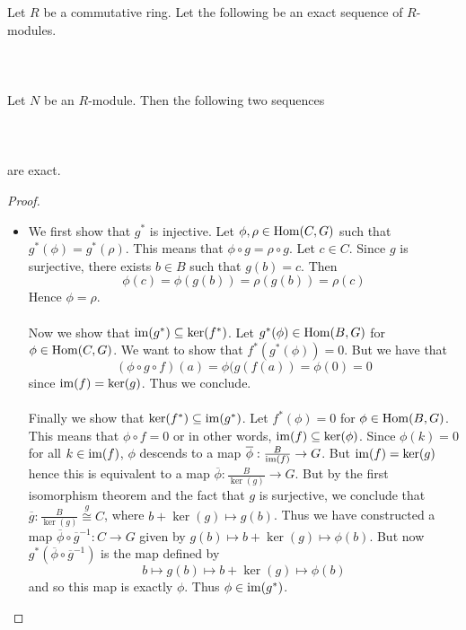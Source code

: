 \documentclass[a4paper]{article}
\begin{document}
\begin{prp}{}{} Let $R$ be a commutative ring. Let the following be an exact sequence of $R$-modules. \\~\\
\\~\\ Let $N$ be an $R$-module. Then the following two sequences \\~\\
 \\~\\ 
are exact. \tcbline
\begin{proof}~\\
\begin{itemize}
\item We first show that $g^\ast$ is injective. Let $\phi,\rho\in\operatorname{Hom}(C,G)$ such that $g^\ast(\phi)=g^\ast(\rho)$. This means that $\phi\circ g=\rho\circ g$. Let $c\in C$. Since $g$ is surjective, there exists $b\in B$ such that $g(b)=c$. Then $$\phi(c)=\phi(g(b))=\rho(g(b))=\rho(c)$$ Hence $\phi=\rho$. \\~\\

Now we show that $\operatorname{im}(g^\ast)\subseteq\ker(f^\ast)$. Let $g^\ast(\phi)\in\operatorname{Hom}(B,G)$ for $\phi\in\operatorname{Hom}(C,G)$. We want to show that $f^\ast(g^\ast(\phi))=0$. But we have that $$(\phi\circ g\circ f)(a)=\phi(g(f(a))=\phi(0)=0$$ since $\operatorname{im}(f)=\ker(g)$. Thus we conclude. \\~\\

Finally we show that $\ker(f^\ast)\subseteq\operatorname{im}(g^\ast)$. Let $f^\ast(\phi)=0$ for $\phi\in\operatorname{Hom}(B,G)$. This means that $\phi\circ f=0$ or in other words, $\operatorname{im}(f)\subseteq\ker(\phi)$.
Since $\phi(k)=0$ for all $k\in\operatorname{im}(f)$, $\phi$ descends to a map $\overline{\phi}:\frac{B}{\operatorname{im}(f)}\to G$. But $\operatorname{im}(f)=\ker(g)$ hence this is equivalent to a map $\overline{\phi}:\frac{B}{\ker(g)}\to G$. But by the first isomorphism theorem and the fact that $g$ is surjective, we conclude that $\overline{g}:\frac{B}{\ker(g)}\overset{g}{\cong} C$, where $b+\ker(g)\mapsto g(b)$. Thus we have constructed a map $\overline{\phi}\circ\overline{g}^{-1}:C\to G$ given by $g(b)\mapsto b+\ker(g)\mapsto\phi(b)$. But now $g^\ast(\overline{\phi}\circ\overline{g}^{-1})$ is the map defined by $$b\mapsto g(b)\mapsto b+\ker(g)\mapsto\phi(b)$$ and so this map is exactly $\phi$. Thus $\phi\in\operatorname{im}(g^\ast)$. 
\end{itemize}
\end{proof}
\end{prp}
\end{document}
